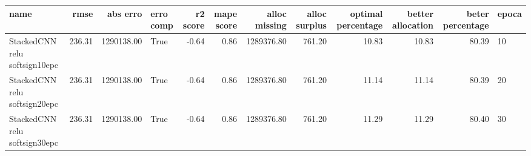 \begin{tabular}{lrrlrrrrrrrl}
\toprule
name & rmse & abs erro & erro comp & r2 score & mape score & alloc missing & alloc surplus & optimal percentage & better allocation & beter percentage & epoca \\
\midrule
StackedCNN relu softsign10epc & 236.31 & 1290138.00 & True & -0.64 & 0.86 & 1289376.80 & 761.20 & 10.83 & 10.83 & 80.39 & 10 \\
StackedCNN relu softsign20epc & 236.31 & 1290138.00 & True & -0.64 & 0.86 & 1289376.80 & 761.20 & 11.14 & 11.14 & 80.39 & 20 \\
StackedCNN relu softsign30epc & 236.31 & 1290138.00 & True & -0.64 & 0.86 & 1289376.80 & 761.20 & 11.29 & 11.29 & 80.40 & 30 \\
\bottomrule
\end{tabular}
